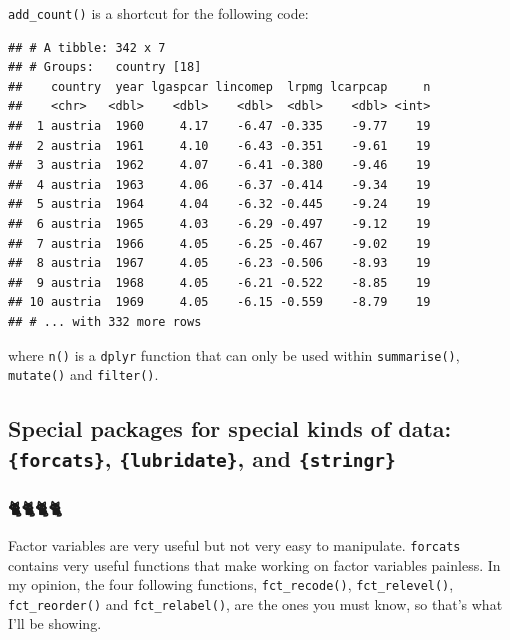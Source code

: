 \documentclass[]{gitbook}
\newenvironment{Shaded}{\begin{snugshade}}{\end{snugshade}}
\newcommand{\DataTypeTok}[1]{\textcolor[rgb]{0.13,0.29,0.53}{#1}}
\newcommand{\KeywordTok}[1]{\textcolor[rgb]{0.13,0.29,0.53}{\textbf{#1}}}
\newcommand{\NormalTok}[1]{#1}
\newcommand{\OperatorTok}[1]{\textcolor[rgb]{0.81,0.36,0.00}{\textbf{#1}}}
\newcommand{\StringTok}[1]{\textcolor[rgb]{0.31,0.60,0.02}{#1}}
\theoremstyle{definition}
\theoremstyle{definition}
\theoremstyle{definition}
\theoremstyle{remark}
\begin{document}
\texttt{add\_count()} is a shortcut for the following code:

\begin{Shaded}
\end{Shaded}

\begin{verbatim}
## # A tibble: 342 x 7
## # Groups:   country [18]
##    country  year lgaspcar lincomep  lrpmg lcarpcap     n
##    <chr>   <dbl>    <dbl>    <dbl>  <dbl>    <dbl> <int>
##  1 austria  1960     4.17    -6.47 -0.335    -9.77    19
##  2 austria  1961     4.10    -6.43 -0.351    -9.61    19
##  3 austria  1962     4.07    -6.41 -0.380    -9.46    19
##  4 austria  1963     4.06    -6.37 -0.414    -9.34    19
##  5 austria  1964     4.04    -6.32 -0.445    -9.24    19
##  6 austria  1965     4.03    -6.29 -0.497    -9.12    19
##  7 austria  1966     4.05    -6.25 -0.467    -9.02    19
##  8 austria  1967     4.05    -6.23 -0.506    -8.93    19
##  9 austria  1968     4.05    -6.21 -0.522    -8.85    19
## 10 austria  1969     4.05    -6.15 -0.559    -8.79    19
## # ... with 332 more rows
\end{verbatim}

where \texttt{n()} is a \texttt{dplyr} function that can only be used
within \texttt{summarise()}, \texttt{mutate()} and \texttt{filter()}.

\hypertarget{special-packages-for-special-kinds-of-data-forcats-lubridate-and-stringr}{%
\subsection{\texorpdfstring{Special packages for special kinds of data:
\texttt{\{forcats\}}, \texttt{\{lubridate\}}, and
\texttt{\{stringr\}}}{Special packages for special kinds of data: \{forcats\}, \{lubridate\}, and \{stringr\}}}\label{special-packages-for-special-kinds-of-data-forcats-lubridate-and-stringr}}

\hypertarget{section}{%
\subsubsection{🐈🐈🐈🐈}\label{section}}

Factor variables are very useful but not very easy to manipulate.
\texttt{forcats} contains very useful functions that make working on
factor variables painless. In my opinion, the four following functions,
\texttt{fct\_recode()}, \texttt{fct\_relevel()}, \texttt{fct\_reorder()}
and \texttt{fct\_relabel()}, are the ones you must know, so that's what
I'll be showing.
\end{document}

